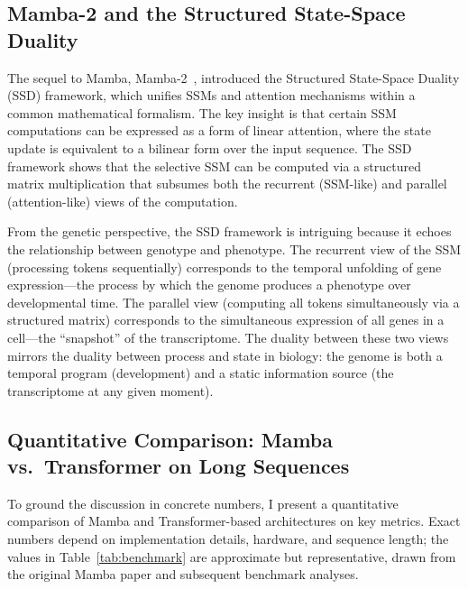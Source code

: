 \documentclass[12pt,a4paper]{article}
\begin{document}
\subsection{Mamba-2 and the Structured State-Space Duality}
\label{sec:mamba2}

The sequel to Mamba, Mamba-2~\cite{dao2024}, introduced the Structured State-Space Duality (SSD) framework, which unifies SSMs and attention mechanisms within a common mathematical formalism. The key insight is that certain SSM computations can be expressed as a form of linear attention, where the state update is equivalent to a bilinear form over the input sequence. The SSD framework shows that the selective SSM can be computed via a structured matrix multiplication that subsumes both the recurrent (SSM-like) and parallel (attention-like) views of the computation.

From the genetic perspective, the SSD framework is intriguing because it echoes the relationship between genotype and phenotype. The recurrent view of the SSM (processing tokens sequentially) corresponds to the temporal unfolding of gene expression---the process by which the genome produces a phenotype over developmental time. The parallel view (computing all tokens simultaneously via a structured matrix) corresponds to the simultaneous expression of all genes in a cell---the ``snapshot'' of the transcriptome. The duality between these two views mirrors the duality between process and state in biology: the genome is both a temporal program (development) and a static information source (the transcriptome at any given moment).

\subsection{Quantitative Comparison: Mamba vs.\ Transformer on Long Sequences}
\label{sec:mamba-bench}

To ground the discussion in concrete numbers, I present a quantitative comparison of Mamba and Transformer-based architectures on key metrics. Exact numbers depend on implementation details, hardware, and sequence length; the values in Table~\ref{tab:benchmark} are approximate but representative, drawn from the original Mamba paper and subsequent benchmark analyses.
\end{document}
